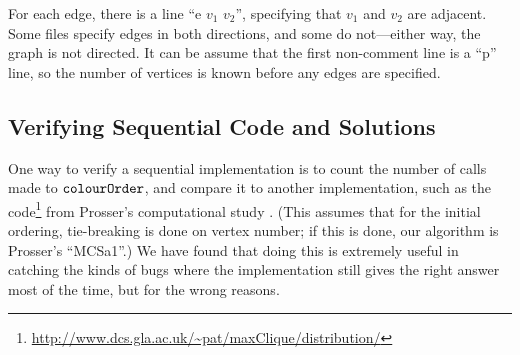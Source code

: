 \documentclass[a4paper]{article}
\newcommand{\colourOrder}{\FuncSty{colourOrder}}
\begin{document}
For each edge, there is a line ``e $v_1$ $v_2$'', specifying that $v_1$ and $v_2$ are adjacent. Some
files specify edges in both directions, and some do not---either way, the graph is not directed.  It
can be assume that the first non-comment line is a ``p'' line, so the number of vertices is known
before any edges are specified.

\subsection{Verifying Sequential Code and Solutions}

One way to verify a sequential implementation is to count the number of calls made to
$\colourOrder$, and compare it to another implementation, such as the
code\footnote{\url{http://www.dcs.gla.ac.uk/~pat/maxClique/distribution/}} from Prosser's
computational study \cite{Prosser:2012}. (This assumes that for the initial ordering, tie-breaking
is done on vertex number; if this is done, our algorithm is Prosser's ``MCSa1''.) We have found that
doing this is extremely useful in catching the kinds of bugs where the implementation still gives
the right answer most of the time, but for the wrong reasons.

\FloatBarrier


\end{document}
